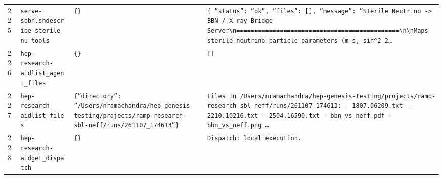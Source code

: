 \documentclass[11pt,a4paper]{article}
\begin{document}
\begin{longtable}{@{}p{}p{}p{}p{}@{}}
225 & \texttt{serve-sbbn.sh}\newline\texttt{describe\_\allowbreak{}sterile\_\allowbreak{}nu\_\allowbreak{}tools} & \texttt{\{\}\allowbreak{}} & \texttt{\{   ''status'':\allowbreak{} ''ok'',\allowbreak{}   ''files'':\allowbreak{} []\allowbreak{},\allowbreak{}   ''message'':\allowbreak{} ''Sterile Neutrino -\textgreater{}\allowbreak{} BBN /\allowbreak{} X-ray Bridge Server\textbackslash{}\allowbreak{}n=\allowbreak{}=\allowbreak{}=\allowbreak{}=\allowbreak{}=\allowbreak{}=\allowbreak{}=\allowbreak{}=\allowbreak{}=\allowbreak{}=\allowbreak{}=\allowbreak{}=\allowbreak{}=\allowbreak{}=\allowbreak{}=\allowbreak{}=\allowbreak{}=\allowbreak{}=\allowbreak{}=\allowbreak{}=\allowbreak{}=\allowbreak{}=\allowbreak{}=\allowbreak{}=\allowbreak{}=\allowbreak{}=\allowbreak{}=\allowbreak{}=\allowbreak{}=\allowbreak{}=\allowbreak{}=\allowbreak{}=\allowbreak{}=\allowbreak{}=\allowbreak{}=\allowbreak{}=\allowbreak{}=\allowbreak{}=\allowbreak{}=\allowbreak{}=\allowbreak{}=\allowbreak{}=\allowbreak{}=\allowbreak{}=\allowbreak{}=\allowbreak{}\textbackslash{}\allowbreak{}n\textbackslash{}\allowbreak{}nMaps sterile-neutrino particle parameters (m\_\allowbreak{}s,\allowbreak{} sin\textasciicircum{}\allowbreak{}2 2\ldots{}\allowbreak{}} \\
226 & \texttt{hep-research-aid}\newline\texttt{list\_\allowbreak{}agent\_\allowbreak{}files} & \texttt{\{\}\allowbreak{}} & \texttt{[]\allowbreak{}} \\
227 & \texttt{hep-research-aid}\newline\texttt{list\_\allowbreak{}files} & \texttt{\{''directory'':\allowbreak{} ''/\allowbreak{}Users/\allowbreak{}nramachandra/\allowbreak{}hep-genesis-testing/\allowbreak{}projects/\allowbreak{}ramp-research-sbl-neff/\allowbreak{}runs/\allowbreak{}261107\_\allowbreak{}174613''\}\allowbreak{}} & \texttt{Files in /\allowbreak{}Users/\allowbreak{}nramachandra/\allowbreak{}hep-genesis-testing/\allowbreak{}projects/\allowbreak{}ramp-research-sbl-neff/\allowbreak{}runs/\allowbreak{}261107\_\allowbreak{}174613:\allowbreak{}   - 1807.06209.txt   - 2210.10216.txt   - 2504.16590.txt   - bbn\_\allowbreak{}vs\_\allowbreak{}neff.pdf   - bbn\_\allowbreak{}vs\_\allowbreak{}neff.png   \ldots{}\allowbreak{}} \\
228 & \texttt{hep-research-aid}\newline\texttt{get\_\allowbreak{}dispatch} & \texttt{\{\}\allowbreak{}} & \texttt{Dispatch:\allowbreak{} local execution.} \\

\end{longtable}
\end{document}

